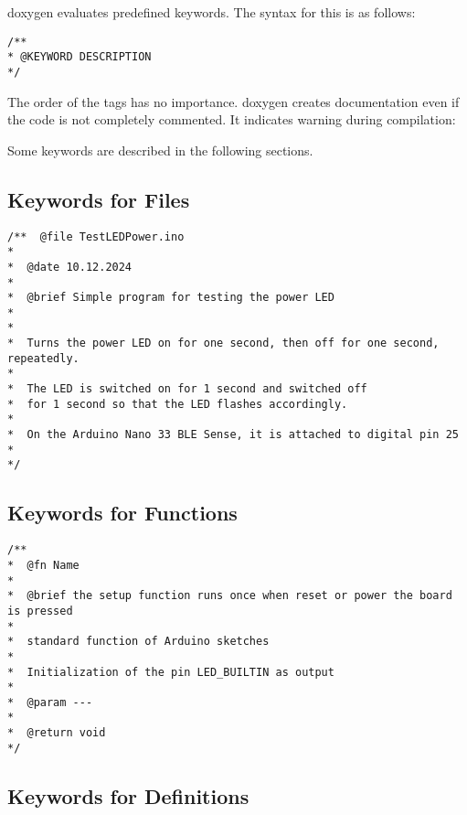 \bigskip


doxygen evaluates predefined keywords. The syntax for this is as follows:


\begin{verbatim}
/**
* @KEYWORD DESCRIPTION
*/
\end{verbatim}

The order of the tags has no importance. 	doxygen creates documentation even if the code is not completely commented. It indicates warning during compilation:

\medskip






\medskip


Some keywords are described in the following sections.





\subsection{Keywords for Files}



\begin{verbatim}
/**  @file TestLEDPower.ino
*
*  @date 10.12.2024
*
*  @brief Simple program for testing the power LED
*	
*
*  Turns the power LED on for one second, then off for one second, repeatedly.
*
*  The LED is switched on for 1 second and switched off 
*  for 1 second so that the LED flashes accordingly.
*
*  On the Arduino Nano 33 BLE Sense, it is attached to digital pin 25
*
*/
\end{verbatim}


\subsection{Keywords for Functions}



\begin{verbatim}
/**  
*  @fn Name 
*
*  @brief the setup function runs once when reset or power the board is pressed
*
*  standard function of Arduino sketches
*  
*  Initialization of the pin LED_BUILTIN as output
*
*  @param ---
*
*  @return void
*/  
\end{verbatim}



\subsection{Keywords for Definitions}

